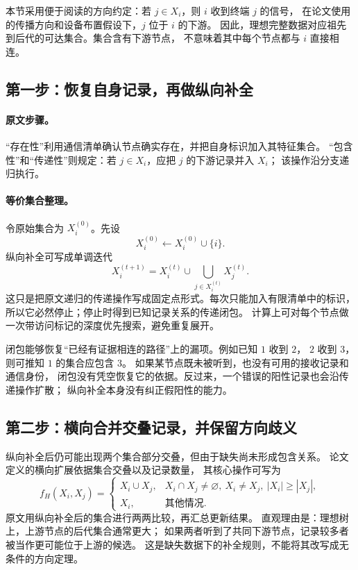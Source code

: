 \documentclass[UTF8,11pt,fontset=fandol,openany,oneside]{ctexbook}
\theoremstyle{definition}
\theoremstyle{remark}
\numberwithin{equation}{chapter}
\begin{document}
本节采用便于阅读的方向约定：若 $j\in X_i$，则 $i$ 收到终端 $j$ 的信号，
在论文使用的传播方向和设备布置假设下，$j$ 位于 $i$ 的下游。
因此，理想完整数据对应祖先到后代的可达集合。集合含有下游节点，
不意味着其中每个节点都与 $i$ 直接相连。

\subsection{第一步：恢复自身记录，再做纵向补全}
\paragraph{原文步骤。}
“存在性”利用通信清单确认节点确实存在，并把自身标识加入其特征集合。
“包含性”和“传递性”则规定：若 $j\in X_i$，应把 $j$ 的下游记录并入 $X_i$；
该操作沿分支递归执行。\citep[第3.1、3.4节]{P4}

\paragraph{等价集合整理。}
令原始集合为 $X_i^{(0)}$。先设
\[
 X_i^{(0)}\leftarrow X_i^{(0)}\cup\{i\}.
\]
纵向补全可写成单调迭代
\begin{equation}\label{eq:tb-P4-closure}
 X_i^{(t+1)}
 =X_i^{(t)}\cup\bigcup_{j\in X_i^{(t)}}X_j^{(t)}.
\end{equation}
这只是把原文递归的传递操作写成固定点形式。每次只能加入有限清单中的标识，
所以它必然停止；停止时得到已知记录关系的传递闭包。
计算上可对每个节点做一次带访问标记的深度优先搜索，避免重复展开。

闭包能够恢复“已经有证据相连的路径”上的漏项。例如已知 $1$ 收到 $2$，
$2$ 收到 $3$，则可推知 $1$ 的集合应包含 $3$。
如果某节点既未被听到，也没有可用的接收记录和通信身份，
闭包没有凭空恢复它的依据。反过来，一个错误的阳性记录也会沿传递操作扩散；
纵向补全本身没有纠正假阳性的能力。

\subsection{第二步：横向合并交叠记录，并保留方向歧义}
纵向补全后仍可能出现两个集合部分交叠，但由于缺失尚未形成包含关系。
论文定义的横向扩展依据集合交叠以及记录数量，
其核心操作可写为
\begin{equation}\label{eq:tb-P4-horizontal}
 f_H(X_i,X_j)=
 \begin{cases}
 X_i\cup X_j,&X_i\cap X_j\ne\varnothing,\ X_i\ne X_j,\
                         |X_i|\ge |X_j|,\\
 X_i,&\text{其他情况}.
 \end{cases}
\end{equation}
原文用纵向补全后的集合进行两两比较，再汇总更新结果。
直观理由是：理想树上，上游节点的后代集合通常更大；
如果两者听到了共同下游节点，记录较多者被当作更可能位于上游的候选。
这是缺失数据下的补全规则，不能将其改写成无条件的方向定理。
\end{document}
